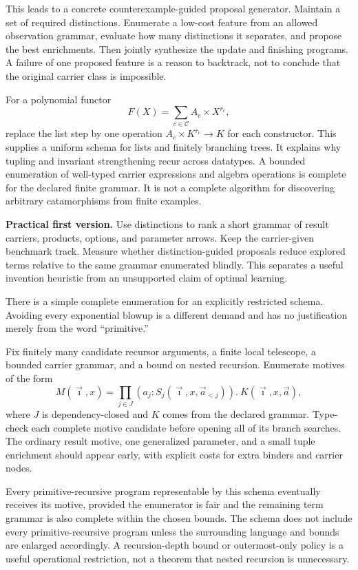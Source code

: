 This leads to a concrete counterexample-guided proposal generator. Maintain a set of required distinctions. Enumerate a low-cost feature from an allowed observation grammar, evaluate how many distinctions it separates, and propose the best enrichments. Then jointly synthesize the update and finishing programs. A failure of one proposed feature is a reason to backtrack, not to conclude that the original carrier class is impossible.

For a polynomial functor
\[
  F(X)=\sum_{c\in\mathcal C} A_c\times X^{r_c},
\]
replace the list step by one operation $A_c\times K^{r_c}\to K$ for each constructor. This supplies a uniform schema for lists and finitely branching trees. It explains why tupling and invariant strengthening recur across datatypes. A bounded enumeration of well-typed carrier expressions and algebra operations is complete for the declared finite grammar. It is not a complete algorithm for discovering arbitrary catamorphisms from finite examples.

\textbf{Practical first version.} Use distinctions to rank a short grammar of result carriers, products, options, and parameter arrows. Keep the carrier-given benchmark track. Measure whether distinction-guided proposals reduce explored terms relative to the same grammar enumerated blindly. This separates a useful invention heuristic from an unsupported claim of optimal learning.

\ans There is a simple complete enumeration for an explicitly restricted schema. Avoiding every exponential blowup is a different demand and has no justification merely from the word ``primitive.''

Fix finitely many candidate recursor arguments, a finite local telescope, a bounded carrier grammar, and a bound on nested recursion. Enumerate motives of the form
\[
 M(\vec\imath,x)=\prod_{j\in J}(a_j:S_j(\vec\imath,x,\vec a_{<j})).\ K(\vec\imath,x,\vec a),
\]
where $J$ is dependency-closed and $K$ comes from the declared grammar. Type-check each complete motive candidate before opening all of its branch searches. The ordinary result motive, one generalized parameter, and a small tuple enrichment should appear early, with explicit costs for extra binders and carrier nodes.

Every primitive-recursive program representable by this schema eventually receives its motive, provided the enumerator is fair and the remaining term grammar is also complete within the chosen bounds. The schema does not include every primitive-recursive program unless the surrounding language and bounds are enlarged accordingly. A recursion-depth bound or outermost-only policy is a useful operational restriction, not a theorem that nested recursion is unnecessary.

